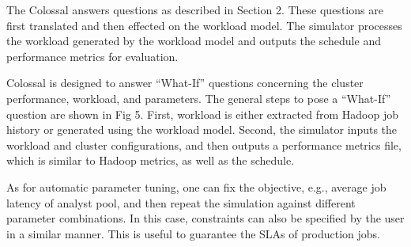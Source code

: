 The Colossal answers questions as
described in Section 2. These questions are first translated and then
effected on the workload model. The simulator processes the workload
generated by the workload model and outputs the schedule and
performance metrics for evaluation. 

Colossal is designed to answer ``What-If'' questions concerning the
cluster performance, workload, and parameters. The general steps to
pose a ``What-If'' question are shown in Fig 5. First, workload is
either extracted from Hadoop job history or generated using the
workload model. Second, the simulator inputs the workload and
cluster configurations, and then outputs a performance metrics
file, which is similar to Hadoop metrics, as well as the schedule.



As for automatic parameter tuning, one can fix
the objective, e.g., average job latency of analyst pool, and then
repeat the simulation against different parameter combinations. In
this case, constraints can also be specified by the user in a
similar manner. This is useful to guarantee the SLAs of production
jobs.


